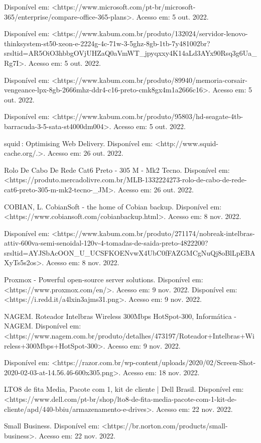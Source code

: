 \documentclass[12pt]{article}
\begin{document}
Disponível em: <https://www.microsoft.com/pt-br/microsoft-365/enterprise/compare-office-365-plans>. Acesso em: 5 out. 2022.

Disponível em: <https://www.kabum.com.br/produto/132024/servidor-lenovo-thinksystem-st50-xeon-e-2224g-4c-71w-3-5ghz-8gb-1tb-7y481002br?srsltid=AR5OiO3hbbgOVjUHZaQ0aVmWT_jpyqxxy4K14aLd3AYx90Rsq3g6Ua_Rg7I>. Acesso em: 5 out. 2022.

Disponível em: <https://www.kabum.com.br/produto/89940/memoria-corsair-vengeance-lpx-8gb-2666mhz-ddr4-c16-preto-cmk8gx4m1a2666c16>. Acesso em: 5 out. 2022.

Disponível em: <https://www.kabum.com.br/produto/95803/hd-seagate-4tb-barracuda-3-5-sata-st4000dm004>. Acesso em: 5 out. 2022.

squid : Optimising Web Delivery. Disponível em: <http://www.squid-cache.org/.>. Acesso em: 26 out. 2022.

Rolo De Cabo De Rede Cat6 Preto - 305 M - Mk2 Tecno. Disponível em: <https://produto.mercadolivre.com.br/MLB-1332224273-rolo-de-cabo-de-rede-cat6-preto-305-m-mk2-tecno-_JM>. Acesso em: 26 out. 2022.

COBIAN, L. CobianSoft - the home of Cobian backup. Disponível em: <https://www.cobiansoft.com/cobianbackup.html>. Acesso em: 8 nov. 2022.

Disponível em: <https://www.kabum.com.br/produto/271174/nobreak-intelbras-attiv-600va-semi-senoidal-120v-4-tomadas-de-saida-preto-4822200?srsltid=AYJSbAcOON_U_UCSFKOENvwX4UbC0fFAZGMCgNuQj8oBlLpEBAXyTs5s2os>. Acesso em: 8 nov. 2022.

Proxmox - Powerful open-source server solutions. Disponível em: <https://www.proxmox.com/en/>. Acesso em: 9 nov. 2022.
Disponível em: <https://i.redd.it/a4lxin3ajms31.png>. Acesso em: 9 nov. 2022.

NAGEM. Roteador Intelbras Wireless 300Mbps HotSpot-300, Informática - NAGEM. Disponível em:
<https://www.nagem.com.br/produto/detalhes/473197/Roteador+Intelbras+Wireless+300Mbps+HotSpot-300>. Acesso em: 9 nov. 2022.

Disponível em: <https://razor.com.br/wp-content/uploads/2020/02/Screen-Shot-2020-02-03-at-14.56.46-600x305.png>. Acesso em: 18 nov. 2022.

LTO8 de fita Media, Pacote com 1, kit de cliente | Dell Brasil. Disponível em: <https://www.dell.com/pt-br/shop/lto8-de-fita-media-pacote-com-1-kit-de-cliente/apd/440-bbiu/armazenamento-e-drives>. Acesso em: 22 nov. 2022.

Small Business. Disponível em: <https://br.norton.com/products/small-business>. Acesso em: 22 nov. 2022.
\end{document}
